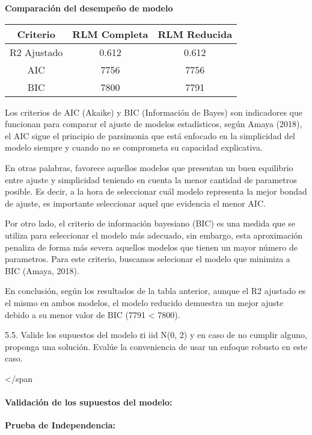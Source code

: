 \documentclass[11pt]{article}
\begin{document}
    \textbf{Comparación del desempeño de modelo}

\begin{longtable}[]{@{}ccc@{}}
\toprule\noalign{}
Criterio & RLM Completa & RLM Reducida \\
\midrule\noalign{}
\endhead
\bottomrule\noalign{}
\endlastfoot
R2 Ajustado & 0.612 & 0.612 \\
AIC & 7756 & 7756 \\
BIC & 7800 & 7791 \\
\end{longtable}

Los criterios de AIC (Akaike) y BIC (Información de Bayes) son
indicadores que funcionan para comparar el ajuste de modelos
estadísticos, según Amaya (2018), el AIC sigue el principio de
parsimonia que está enfocado en la simplicidad del modelo siempre y
cuando no se comprometa su capacidad explicativa.

En otras palabras, favorece aquellos modelos que presentan un buen
equilibrio entre ajuste y simplicidad teniendo en cuenta la menor
cantidad de parametros posible. Es decir, a la hora de seleccionar cuál
modelo representa la mejor bondad de ajuste, es importante seleccionar
aquel que evidencia el menor AIC.

Por otro lado, el criterio de información bayesiano (BIC) es una medida
que se utiliza para seleccionar el modelo más adecuado, sin embargo,
esta aproximación penaliza de forma más severa aquellos modelos que
tienen un mayor número de parametros. Para este criterio, buscamos
selecionar el modelo que minimiza a BIC (Amaya, 2018).

En conclusión, según los resultados de la tabla anterior, aunque el R2
ajustado es el mismo en ambos modelos, el modelo reducido demuestra un
mejor ajuste debido a su menor valor de BIC (7791 \textless{} 7800).

    5.5. Valide los supuestos del modelo εi iid N(0, 2) y en caso de no
cumplir alguno, proponga una solución. Evalúe la conveniencia de usar un
enfoque robusto en este caso.

\textless/span

    \paragraph{\texorpdfstring{\textbf{Validación de los supuestos del
modelo:}}{Validación de los supuestos del modelo:}}\label{validaciuxf3n-de-los-supuestos-del-modelo}

    \textbf{Prueba de Independencia:}
\end{document}
